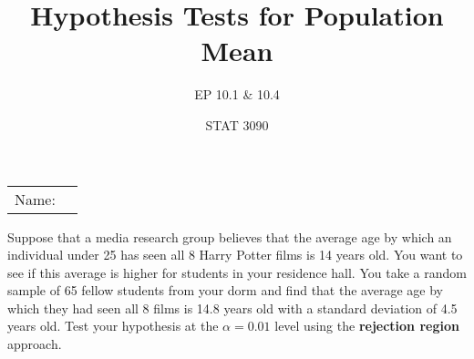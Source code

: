 \documentclass[noanswers]{exam}
\title{Hypothesis Tests for Population Mean}
\author{EP 10.1 \& 10.4}
\date{STAT 3090}
\begin{document}
\noindent\begin{tabular}{@{}p{.5in}p{2.5in}@{}}
Name: & \hrulefill 
\end{tabular}

\vspace{3mm}

\begin{questions} 

\question Suppose that a media research group believes that the average age by which an individual under 25 has seen all 8 Harry Potter films is 14 years old. You want to see if this average is higher for students in your residence hall. You take a random sample of 65 fellow students from your dorm and find that the average age by which they had seen all 8 films is 14.8 years old with a standard deviation of 4.5 years old. Test your hypothesis at the $\alpha=0.01$ level using the \textbf{rejection region} approach.

\vspace{3mm}

\end{questions}
\end{document}
